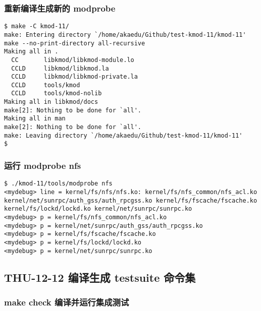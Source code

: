 \documentclass[11pt,a4paper]{article}
\begin{document}
\subsubsection{重新编译生成新的 modprobe}

{\begin{shaded}\begin{verbatim}
$ make -C kmod-11/
make: Entering directory `/home/akaedu/Github/test-kmod-11/kmod-11'
make --no-print-directory all-recursive
Making all in .
  CC       libkmod/libkmod-module.lo
  CCLD     libkmod/libkmod.la
  CCLD     libkmod/libkmod-private.la
  CCLD     tools/kmod
  CCLD     tools/kmod-nolib
Making all in libkmod/docs
make[2]: Nothing to be done for `all'.
Making all in man
make[2]: Nothing to be done for `all'.
make: Leaving directory `/home/akaedu/Github/test-kmod-11/kmod-11'
$ 
\end{verbatim}\end{shaded}}
\subsubsection{运行 modprobe nfs}

{\begin{shaded}\begin{verbatim}
$ ./kmod-11/tools/modprobe nfs
<mydebug> line = kernel/fs/nfs/nfs.ko: kernel/fs/nfs_common/nfs_acl.ko kernel/net/sunrpc/auth_gss/auth_rpcgss.ko kernel/fs/fscache/fscache.ko kernel/fs/lockd/lockd.ko kernel/net/sunrpc/sunrpc.ko
<mydebug> p = kernel/fs/nfs_common/nfs_acl.ko
<mydebug> p = kernel/net/sunrpc/auth_gss/auth_rpcgss.ko
<mydebug> p = kernel/fs/fscache/fscache.ko
<mydebug> p = kernel/fs/lockd/lockd.ko
<mydebug> p = kernel/net/sunrpc/sunrpc.ko
\end{verbatim}\end{shaded}}
\subsection{THU-12-12 编译生成 testsuite 命令集}

\subsubsection{make check 编译并运行集成测试}
\end{document}
